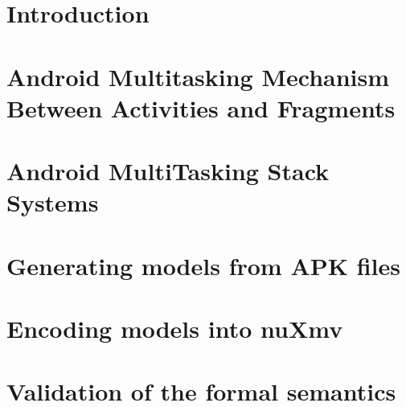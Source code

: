 \documentclass[acmsmall,manuscript,screen,review]{acmart}
\begin{document}

\maketitle


\section{Introduction}\label{sec:introduction}


%

\section{Android Multitasking Mechanism Between Activities and Fragments} \label{sec:amm}


\section{Android MultiTasking Stack Systems} \label{sec:amass}


\section{Generating {\AMASS} models from APK files}\label{sec:apk2amass}


\section{Encoding {\AMASS} models into nuXmv}\label{sec:amass2fsm}


\section{Validation of the formal semantics} \label{sec:validation}

\end{document}
